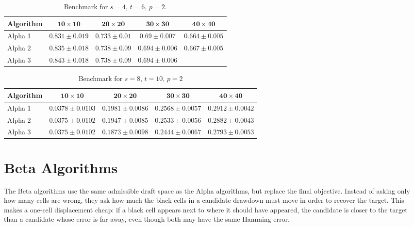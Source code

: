\documentclass[11pt]{article}
\begin{document}
\begin{table}[ht]
  \centering
    \begin{tabular}{lcccc}
    \hline
    \textbf{Algorithm} & \(\boldsymbol{10\times10}\) & \(\boldsymbol{20\times20}\) & \(\boldsymbol{30\times30}\) & \(\boldsymbol{40\times40}\) \\
    \hline
    Alpha 1 & $0.831 \pm 0.019$ & $0.733\pm 0.01$ & $0.69\pm 0.007$ &  $0.664\pm 0.005$ \\
    Alpha 2 & $0.835\pm 0.018$ &  $0.738\pm 0.09$ & $0.694\pm 0.006$ & $0.667\pm0.005$\\
    Alpha 3 &  $0.843\pm 0.018$ & $0.738\pm 0.09$ & $0.694\pm 0.006$ & \\
    \hline
  \end{tabular}
  \caption{Benchmark for $s=4$, $t=6$, $p=2$.}
  \label{tab:benchmark-four-shaft}
\end{table}


\begin{table}[ht]
  \centering
  \begin{tabular}{lcccc}
    \hline
    \textbf{Algorithm} & \(\boldsymbol{10\times10}\) & \(\boldsymbol{20\times20}\) & \(\boldsymbol{30\times30}\) & \(\boldsymbol{40\times40}\) \\
    \hline
    Alpha 1 & $0.0378 \pm 0.0103$ & $0.1981 \pm 0.0086$ & $0.2568 \pm 0.0057$ & $0.2912 \pm 0.0042$ \\
    Alpha 2 & $0.0375 \pm 0.0102$ & $0.1947 \pm 0.0085$ & $0.2533 \pm 0.0056$ & $0.2882 \pm 0.0043$ \\
    Alpha 3 & $0.0375 \pm 0.0102$ & $0.1873 \pm 0.0098$ & $0.2444 \pm 0.0067$ & $0.2793 \pm 0.0053$ \\
    \hline
  \end{tabular}
    \caption{Benchmark for $s=8$, $t=10$, $p=2$}
    \label{tab:benchmark-eight-shaft}

\end{table}


\newpage 
\section{Beta Algorithms}

The Beta algorithms use the same admissible draft space as the Alpha
algorithms, but replace the final objective. Instead of asking only how many
cells are wrong, they ask how much the black cells in a candidate drawdown must
move in order to recover the target.  This makes a one-cell displacement cheap:
if a black cell appears next to where it should have appeared, the candidate is
closer to the target than a candidate whose error is far away, even though both
may have the same Hamming error.
\end{document}
